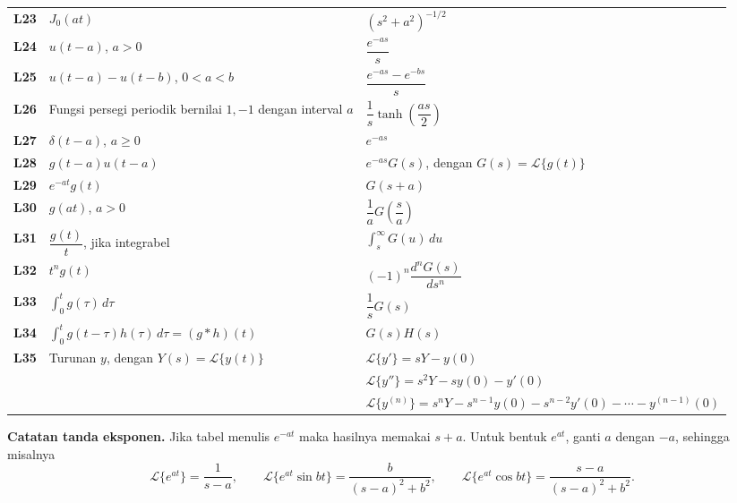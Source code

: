 \documentclass[10pt,a4paper]{article}
\newcommand{\Lcal}{\mathcal{L}}
\newcommand{\Lap}[1]{\Lcal\{#1\}}
\begin{document}
\begin{longtable}{>{\bfseries}p{} p{} p{}}
L23 & $J_0(at)$ & $(s^2+a^2)^{-1/2}$\\
L24 & $u(t-a)$, $a>0$ & $\dfrac{e^{-as}}{s}$\\
L25 & $u(t-a)-u(t-b)$, $0<a<b$ & $\dfrac{e^{-as}-e^{-bs}}{s}$\\
L26 & Fungsi persegi periodik bernilai $1,-1$ dengan interval $a$ & $\dfrac{1}{s}\tanh\left(\dfrac{as}{2}\right)$\\
L27 & $\delta(t-a)$, $a\ge0$ & $e^{-as}$\\
L28 & $g(t-a)u(t-a)$ & $e^{-as}G(s)$, dengan $G(s)=\Lap{g(t)}$\\
L29 & $e^{-at}g(t)$ & $G(s+a)$\\
L30 & $g(at)$, $a>0$ & $\dfrac{1}{a}G\left(\dfrac{s}{a}\right)$\\
L31 & $\dfrac{g(t)}{t}$, jika integrabel & $\displaystyle\int_s^\infty G(u)\,du$\\
L32 & $t^n g(t)$ & $(-1)^n\dfrac{d^nG(s)}{ds^n}$\\
L33 & $\displaystyle\int_0^t g(\tau)\,d\tau$ & $\dfrac{1}{s}G(s)$\\
L34 & $\displaystyle\int_0^t g(t-\tau)h(\tau)\,d\tau=(g*h)(t)$ & $G(s)H(s)$\\
L35 & Turunan $y$, dengan $Y(s)=\Lap{y(t)}$ & $\Lap{y'}=sY-y(0)$\\
 & & $\Lap{y''}=s^2Y-sy(0)-y'(0)$\\
 & & $\Lap{y^{(n)}}=s^nY-s^{n-1}y(0)-s^{n-2}y'(0)-\cdots-y^{(n-1)}(0)$\\
\bottomrule
\end{longtable}

\normalsize
\noindent\textbf{Catatan tanda eksponen.} Jika tabel menulis $e^{-at}$ maka hasilnya memakai $s+a$. Untuk bentuk $e^{at}$, ganti $a$ dengan $-a$, sehingga misalnya
\[
\Lap{e^{at}}=\frac{1}{s-a},\qquad
\Lap{e^{at}\sin bt}=\frac{b}{(s-a)^2+b^2},\qquad
\Lap{e^{at}\cos bt}=\frac{s-a}{(s-a)^2+b^2}.
\]
\end{document}
